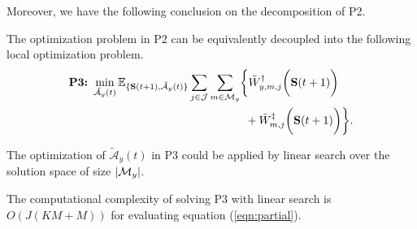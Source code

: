 Moreover, we have the following conclusion on the decomposition of P2.
\begin{lemma}[]
    The optimization problem in P2 can be equivalently decoupled into the following local optimization problem.
    {\small
    \begin{align}
        \textbf{P3:}~
        \min_{ \tilde{\mathcal{A}}_{y}(t) }
        \mathbb{E}_{\set{ \Stat(t+1), \tilde{\mathcal{A}}_{y}(t) }}
        &\sum_{j\in\jSpace} \sum_{m\in\esSet_{y}} \Brace{
            \tilde{W}^{\AP}_{y,m,j}\Paren{\Stat(t+1)}
            \nonumber\\
            &~~~~~~~~~~~~~~~+\tilde{W}^{\ES}_{m,j}\Paren{\Stat(t+1)}
        }.
        \label{eqn:partial}
    \end{align}
    }
\end{lemma}

The optimization of $\tilde{\mathcal{A}}_{y}(t)$ in P3 could be applied by linear search over the solution space of size $|\mathcal{M}_{y}|$.
\begin{remark}
    The computational complexity of solving P3 with linear search is $O(J(KM+M))$ for evaluating equation (\ref{eqn:partial}).
\end{remark}

